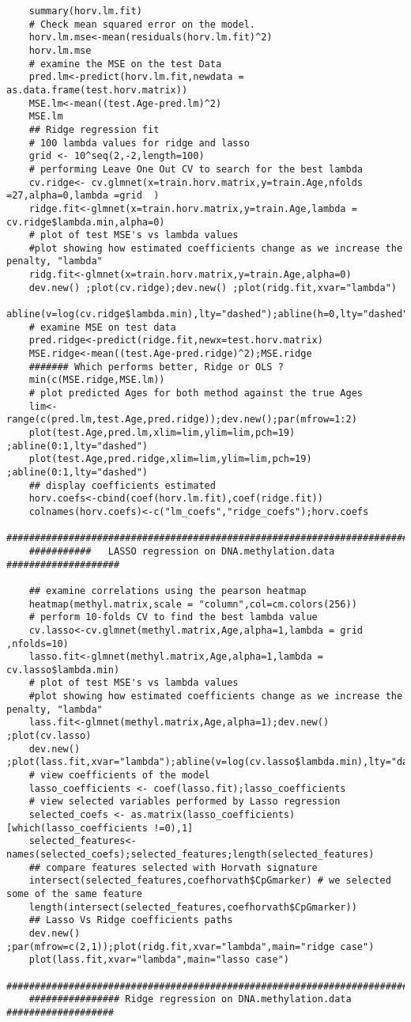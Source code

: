 \documentclass[12pt]{report}
\begin{document}
\begin{lstlisting}
	summary(horv.lm.fit)
	# Check mean squared error on the model.
	horv.lm.mse<-mean(residuals(horv.lm.fit)^2)
	horv.lm.mse
	# examine the MSE on the test Data
	pred.lm<-predict(horv.lm.fit,newdata = as.data.frame(test.horv.matrix))
	MSE.lm<-mean((test.Age-pred.lm)^2)
	MSE.lm
	## Ridge regression fit
	# 100 lambda values for ridge and lasso
	grid <- 10^seq(2,-2,length=100) 
	# performing Leave One Out CV to search for the best lambda
	cv.ridge<- cv.glmnet(x=train.horv.matrix,y=train.Age,nfolds =27,alpha=0,lambda =grid  )
	ridge.fit<-glmnet(x=train.horv.matrix,y=train.Age,lambda = cv.ridge$lambda.min,alpha=0)
	# plot of test MSE's vs lambda values
	#plot showing how estimated coefficients change as we increase the penalty, "lambda"
	ridg.fit<-glmnet(x=train.horv.matrix,y=train.Age,alpha=0)
	dev.new() ;plot(cv.ridge);dev.new() ;plot(ridg.fit,xvar="lambda")
	abline(v=log(cv.ridge$lambda.min),lty="dashed");abline(h=0,lty="dashed")
	# examine MSE on test data
	pred.ridge<-predict(ridge.fit,newx=test.horv.matrix)
	MSE.ridge<-mean((test.Age-pred.ridge)^2);MSE.ridge
	####### Which performs better, Ridge or OLS ?
	min(c(MSE.ridge,MSE.lm))
	# plot predicted Ages for both method against the true Ages
	lim<-range(c(pred.lm,test.Age,pred.ridge));dev.new();par(mfrow=1:2)
	plot(test.Age,pred.lm,xlim=lim,ylim=lim,pch=19) ;abline(0:1,lty="dashed")
	plot(test.Age,pred.ridge,xlim=lim,ylim=lim,pch=19) ;abline(0:1,lty="dashed")
	## display coefficients estimated
	horv.coefs<-cbind(coef(horv.lm.fit),coef(ridge.fit))
	colnames(horv.coefs)<-c("lm_coefs","ridge_coefs");horv.coefs
	###########################################################################
	###########   LASSO regression on DNA.methylation.data ####################
	
	## examine correlations using the pearson heatmap
	heatmap(methyl.matrix,scale = "column",col=cm.colors(256))
	# perform 10-folds CV to find the best lambda value
	cv.lasso<-cv.glmnet(methyl.matrix,Age,alpha=1,lambda = grid ,nfolds=10)
	lasso.fit<-glmnet(methyl.matrix,Age,alpha=1,lambda = cv.lasso$lambda.min)
	# plot of test MSE's vs lambda values
	#plot showing how estimated coefficients change as we increase the penalty, "lambda"
	lass.fit<-glmnet(methyl.matrix,Age,alpha=1);dev.new() ;plot(cv.lasso)
	dev.new() ;plot(lass.fit,xvar="lambda");abline(v=log(cv.lasso$lambda.min),lty="dashed")
	# view coefficients of the model
	lasso_coefficients <- coef(lasso.fit);lasso_coefficients
	# view selected variables performed by Lasso regression
	selected_coefs <- as.matrix(lasso_coefficients)[which(lasso_coefficients !=0),1]
	selected_features<-names(selected_coefs);selected_features;length(selected_features)
	## compare features selected with Horvath signature
	intersect(selected_features,coefhorvath$CpGmarker) # we selected some of the same feature
	length(intersect(selected_features,coefhorvath$CpGmarker))
	## Lasso Vs Ridge coefficients paths
	dev.new() ;par(mfrow=c(2,1));plot(ridg.fit,xvar="lambda",main="ridge case")
	plot(lass.fit,xvar="lambda",main="lasso case")
	#############################################################################
	################ Ridge regression on DNA.methylation.data ###################
	

\end{lstlisting}
\end{document}
